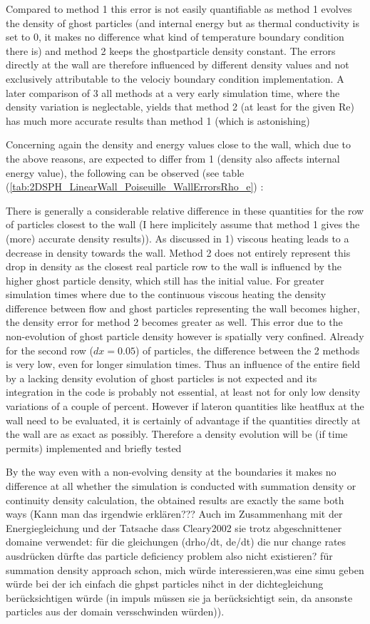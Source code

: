 \documentclass{report}
\begin{document}
Compared to method 1 this error is not easily quantifiable as method 1 evolves the density of ghost particles (and internal energy but as thermal conductivity is set to 0, it makes no difference what kind of temperature boundary condition there is) and method 2 keeps the ghostparticle density constant. The errors directly at the wall are therefore influenced by different density values and not exclusively attributable to the velociy boundary condition implementation. A later comparison of 3 all methods at a very early simulation time, where the density variation is neglectable, yields that method 2 (at least for the given Re) has much more accurate results than method 1 (which is astonishing)

Concerning again the density and energy values close to the wall, which due to the above reasons, are expected to differ from 1 (density also affects internal energy value), the following can be observed (see table (\ref{tab:2DSPH_LinearWall_Poiseuille_WallErrorsRho_e}) : 

There is generally a considerable relative difference in these quantities for the row of particles closest to the wall (I here implicitely assume that method 1 gives the (more) accurate density results)). As discussed in 1) viscous heating leads to a decrease in density towards the wall. Method 2 does not entirely represent this drop in density as the closest real particle row to the wall is influencd by the higher ghost particle density, which still has the initial value. For greater simulation times where due to the continuous viscous heating the density difference between flow and ghost particles representing the wall becomes higher, the density error for method 2 becomes greater as well. 
This error due to the non-evolution of ghost particle density however is spatially very confined. Already for the second row ($dx=0.05$) of particles, the difference between the 2 methods is very low, even for longer simulation times.
Thus an influence of the entire field by a lacking density evolution of ghost particles is not expected and its integration in the code is probably not essential, at least not for only low density variations of a couple of percent. However if lateron quantities like heatflux at the wall need to be evaluated, it is certainly of advantage if the quantities directly at the wall are as exact as possibly. Therefore a density evolution will be (if time permits) implemented and briefly tested

By the way even with a non-evolving density at the boundaries it makes no difference at all whether the simulation is conducted with summation density or continuity density calculation, the obtained results are exactly the same both ways (Kann man das irgendwie erklären??? Auch im Zusammenhang mit der Energiegleichung und der Tatsache dass Cleary2002 sie trotz abgeschnittener domaine verwendet: für die gleichungen (drho/dt, de/dt) die nur change rates ausdrücken dürfte das particle deficiency problem  also nicht existieren?
für summation density approach schon, mich würde interessieren,was eine simu geben würde bei der ich einfach die ghpst particles nihct in der dichtegleichung berücksichtigen würde (in impuls müssen sie ja berücksichtigt sein, da ansonste particles aus der domain versschwinden würden)).
\end{document}
